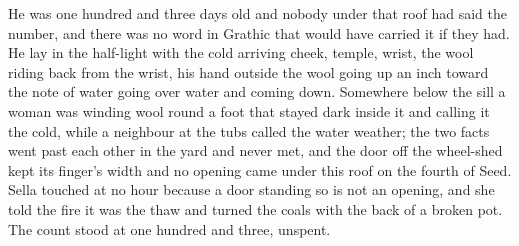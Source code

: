 He was one hundred and three days old and nobody under that roof had said the number, and there was no word in Grathic that would have carried it if they had. He lay in the half-light with the cold arriving cheek, temple, wrist, the wool riding back from the wrist, his hand outside the wool going up an inch toward the note of water going over water and coming down. Somewhere below the sill a woman was winding wool round a foot that stayed dark inside it and calling it the cold, while a neighbour at the tubs called the water weather; the two facts went past each other in the yard and never met, and the door off the wheel-shed kept its finger's width and no opening came under this roof on the fourth of Seed. Sella touched  at no hour because a door standing so is not an opening, and she told the fire it was the thaw and turned the coals with the back of a broken pot. The count stood at one hundred and three, unspent.
